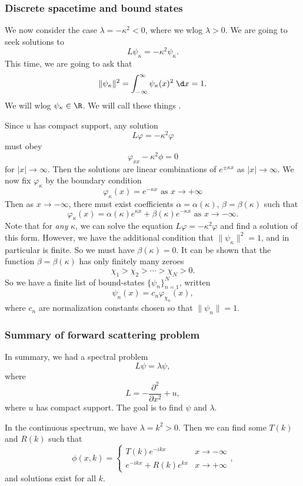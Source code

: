\documentclass[a4paper]{article}
\begin{document}
\subsubsection{Discrete spacetime and bound states}
We now consider the case $\lambda = - \kappa^2 < 0$, where we wlog $\lambda > 0$. We are going to seek solutions to
\[
  L \psi_\kappa = - \kappa^2 \psi_\kappa.
\]
This time, we are going to ask that
\[
  \|\psi_\kappa\|^2 = \int_{-\infty}^\infty \psi_\kappa(x)^2 \;\d x = 1.
\]
We will wlog $\psi_\kappa \in \R$. We will call these things .

Since $u$ has compact support, any solution
\[
  L \varphi = - \kappa^2 \varphi
\]
must obey
\[
  \varphi_{xx} - \kappa^2 \phi = 0
\]
for $|x| \to \infty$. Then the solutions are linear combinations of $e^{\pm \kappa x}$ as $|x| \to \infty$. We now fix $\varphi_\kappa$ by the boundary condition
\[
  \varphi_\kappa(x) = e^{-\kappa x} \text{ as } x \to +\infty
\]
Then as $x \to -\infty$, there must exist coefficients $\alpha = \alpha(\kappa)$, $\beta = \beta(\kappa)$ such that
\[
  \varphi_\kappa(x) = \alpha(\kappa) e^{\kappa x} + \beta(\kappa) e^{-\kappa x}\text{ as }x \to -\infty.
\]
Note that for \emph{any} $\kappa$, we can solve the equation $L \varphi = - \kappa^2 \varphi$ and find a solution of this form. However, we have the additional condition that $\|\psi_\kappa\|^2 = 1$, and in particular is finite. So we must have $\beta(\kappa) = 0$. It can be shown that the function $\beta = \beta(\kappa)$ has only finitely many zeroes
\[
  \chi_1 > \chi_2 > \cdots > \chi_N > 0.
\]
So we have a finite list of bound-states $\{\psi_n\}_{n= 1}^N$, written
\[
  \psi_n(x) = c_n \varphi_{\chi_n}(x),
\]
where $c_n$ are normalization constants chosen so that $\|\psi_n\| = 1$.

\subsubsection{Summary of forward scattering problem}
In summary, we had a spectral problem
\[
  L\psi = \lambda \psi,
\]
where
\[
  L = -\frac{\partial^2}{\partial x^2} + u,
\]
where $u$ has compact support. The goal is to find $\psi$ and $\lambda$.

In the continuous spectrum, we have $\lambda = k^2 > 0$. Then we can find some $T(k)$ and $R(k)$ such that
\[
  \phi(x, k) =
  \begin{cases}
    T(k) e^{-ikx} & x \to -\infty\\
    e^{-ikx} + R(k) e^{kx} & x \to +\infty
  \end{cases},
\]
and solutions exist for all $k$.
\end{document}
